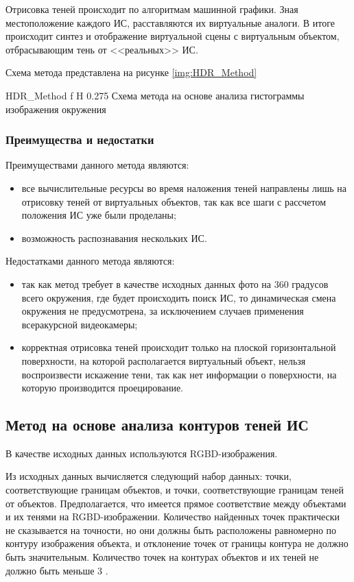 Отрисовка теней происходит по алгоритмам машинной графики. Зная местоположение каждого ИС, расставляются их виртуальные аналоги. В итоге происходит синтез и отображение виртуальной сцены с виртуальным объектом, отбрасывающим тень от <<реальных>> ИС.

Схема метода представлена на рисунке \ref{img:HDR_Method}

	{HDR_Method}
	{f}
	{H}
	{0.275\textwidth}
	{Схема метода на основе анализа гистограммы изображения окружения}

\subsubsection*{Преимущества и недостатки}

Преимуществами данного метода являются: 
\begin{itemize}
	\item все вычислительные ресурсы во время наложения теней направлены лишь на отрисовку теней от виртуальных объектов, так как все шаги с рассчетом положения ИС уже были проделаны;
	\item возможность распознавания нескольких ИС.
\end{itemize}

Недостатками данного метода являются:
\begin{itemize}
	\item так как метод требует в качестве исходных данных фото на 360 градусов всего окружения, где будет происходить поиск ИС, то динамическая смена окружения не предусмотрена, за исключением случаев применения всеракурсной видеокамеры;
	\item корректная отрисовка теней происходит только на плоской горизонтальной поверхности, на которой располагается виртуальный объект, нельзя воспроизвести искажение тени, так как нет информации о поверхности, на которую производится проецирование.
\end{itemize}

\subsection{Метод на основе анализа контуров теней ИС}

В качестве исходных данных используются RGBD-изображения.

Из исходных данных вычисляется следующий набор данных: точки, соответствующие границам объектов, и точки, соответствующие границам теней от объектов. Предполагается, что имеется прямое соответствие между объектами и их тенями на RGBD-изображении. Количество найденных точек практически не сказывается на точности, но они должны быть расположены равномерно по контуру изображения объекта, и отклонение точек от границы контура не должно быть значительным. Количество точек на контурах объектов и их теней не должно быть меньше 3 \cite{shadow_contours_method}.

